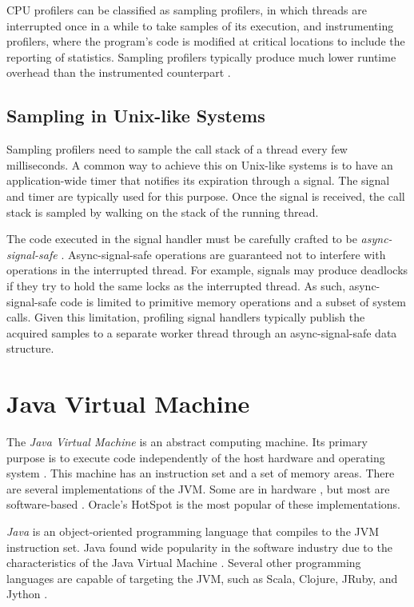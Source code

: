 CPU profilers can be classified as sampling profilers, in which threads are interrupted once in a while to take samples of its execution, and instrumenting profilers, where the program's code is modified at critical locations to include the reporting of statistics. Sampling profilers typically produce much lower runtime overhead than the instrumented counterpart \cite{moseley2007shadow}.

\subsection{Sampling in Unix-like Systems}

Sampling profilers need to sample the call stack of a thread every few milliseconds. A common way to achieve this on Unix-like systems is to have an application-wide timer that notifies its expiration through a signal. The  signal and  timer are typically used for this purpose. Once the signal is received, the call stack is sampled by walking on the stack of the running thread.

The code executed in the signal handler must be carefully crafted to be \emph{async-signal-safe} \cite{signalsafety}. Async-signal-safe operations are guaranteed not to interfere with operations in the interrupted thread. For example, signals may produce deadlocks if they try to hold the same locks as the interrupted thread. As such, async-signal-safe code is limited to primitive memory operations and a subset of system calls. Given this limitation, profiling signal handlers typically publish the acquired samples to a separate worker thread through an async-signal-safe data structure.


\section{Java Virtual Machine}

The \emph{Java Virtual Machine} is an abstract computing machine. Its primary purpose is to execute code independently of the host hardware and operating system \cite{jvmspec}\nocite{venners1998inside}. This machine has an instruction set and a set of memory areas. There are several implementations of the JVM. Some are in hardware \cite{picojava}, but most are software-based \cite{hotspot, j9, zing}. Oracle's HotSpot is the most popular of these implementations.

\emph{Java} is an object-oriented programming language that compiles to the JVM instruction set. Java found wide popularity in the software industry due to the characteristics of the Java Virtual Machine \cite{kumar2017survey}. Several other programming languages are capable of targeting the JVM, such as Scala, Clojure, JRuby, and Jython \cite{li2013hosted}.

